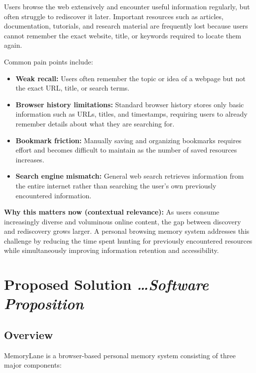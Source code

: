 \documentclass[11pt,a4paper]{article}
\newcommand{\BvrHint}[1]{%
  {\normalfont\normalsize\itshape\hfill #1}}
\begin{document}
Users browse the web extensively and encounter useful information regularly, but often struggle to rediscover it later. Important resources such as articles, documentation, tutorials, and research material are frequently lost because users cannot remember the exact website, title, or keywords required to locate them again.

Common pain points include:

\begin{itemize}[leftmargin=0.7cm]

\item \textbf{Weak recall:} Users often remember the topic or idea of a webpage but not the exact URL, title, or search terms.

\item \textbf{Browser history limitations:} Standard browser history stores only basic information such as URLs, titles, and timestamps, requiring users to already remember details about what they are searching for.

\item \textbf{Bookmark friction:} Manually saving and organizing bookmarks requires effort and becomes difficult to maintain as the number of saved resources increases.

\item \textbf{Search engine mismatch:} General web search retrieves information from the entire internet rather than searching the user's own previously encountered information.

\end{itemize}

\textbf{Why this matters now (contextual relevance):} As users consume increasingly diverse and voluminous online content, the gap between discovery and rediscovery grows larger. A personal browsing memory system addresses this challenge by reducing the time spent hunting for previously encountered resources while simultaneously improving information retention and accessibility.


\section{Proposed Solution %
  \BvrHint{\ldots Software Proposition}}

\subsection{Overview}

MemoryLane is a browser-based personal memory system consisting of three major components:
\end{document}
